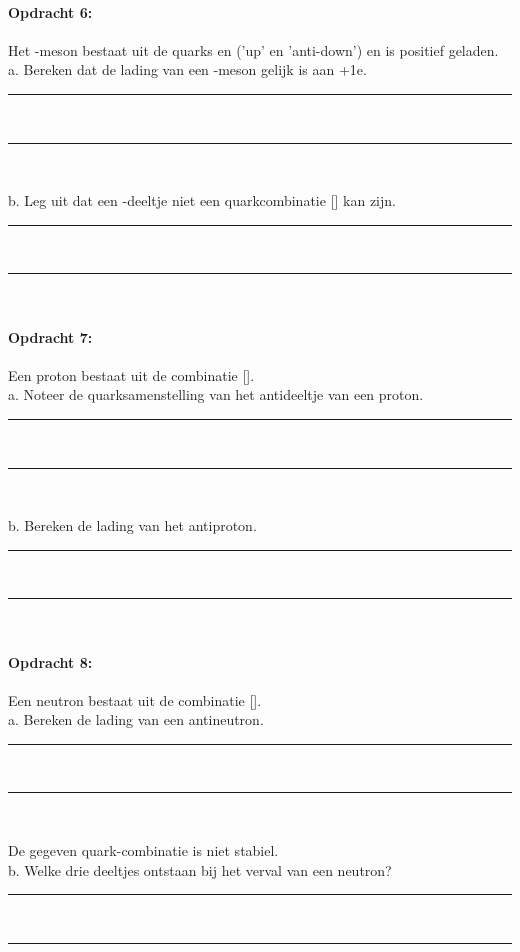 \paragraph{Opdracht 6:}
Het \Ppiplus-meson bestaat uit de quarks \Pup en \APdown  ('up' en 'anti-down')
en is positief geladen.\\
a. Bereken dat de lading van een \Ppiplus-meson gelijk is aan +1e.
\begin{center}
    \rule{\textwidth}{0.3mm}\\
    \rule{\textwidth}{0.3mm}\\
\end{center}
b. Leg uit dat een \PSigmaplus-deeltje niet een quarkcombinatie [\Pstrange\Pdown\Pdown] 
kan zijn.
\begin{center}
    \rule{\textwidth}{0.3mm}\\
    \rule{\textwidth}{0.3mm}\\
\end{center}

\paragraph{Opdracht 7:}
Een proton bestaat uit de combinatie [\Pup\Pup\Pdown].\\
a. Noteer de quarksamenstelling van het antideeltje van een proton.
\begin{center}
    \rule{\textwidth}{0.3mm}\\
    \rule{\textwidth}{0.3mm}\\
\end{center}
b. Bereken de lading van het antiproton.
\begin{center}
    \rule{\textwidth}{0.3mm}\\
    \rule{\textwidth}{0.3mm}\\
\end{center}

\paragraph{Opdracht 8:}
Een neutron bestaat uit de combinatie [\Pup\Pdown\Pdown].\\
a. Bereken de lading van een antineutron.
\begin{center}
    \rule{\textwidth}{0.3mm}\\
    \rule{\textwidth}{0.3mm}\\
\end{center}
De gegeven quark-combinatie is niet stabiel.\\
b. Welke drie deeltjes ontstaan bij het verval van een neutron?
\begin{center}
    \rule{\textwidth}{0.3mm}\\
    \rule{\textwidth}{0.3mm}\\
\end{center}

